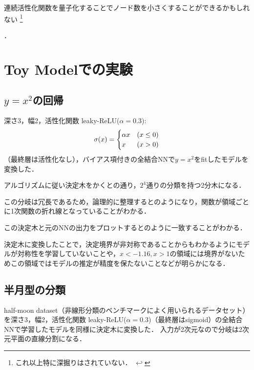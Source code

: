 \documentclass[dvipdfmx,autodetect-engine,12pt,fleqn]{jsarticle}
\newcounter{footnote-anchor}
\newcommand{\footnoteanchor}[1]{
    \hypertarget{footnote-anchor\arabic{footnote-anchor}}{}%
    \footnote{#1 \hyperlink{footnote-anchor\arabic{footnote-anchor}}{$\hookleftarrow$}}%
    \addtocounter{footnote-anchor}{1}
}
\begin{document}
連続活性化関数を量子化することでノード数を小さくすることができるかもしれない\footnoteanchor{これ以上特に深掘りはされていない．}．

\section{Toy Modelでの実験}

\subsection{$y=x^2$の回帰}

深さ3，幅2，活性化関数 leaky-ReLU($\alpha=0.3$):
\[
\sigma\lparen x\rparen=\begin{cases}
\alpha x & (x\le 0)\\
x & (x>0)
\end{cases}
\]
（最終層は活性化なし），バイアス項付きの全結合NNで$y=x^2$をfitしたモデルを変換した．

アルゴリズムに従い決定木をかくとの通り，$2^4$通りの分類を持つ2分木になる．


この分岐は冗長であるため，論理的に整理するとのようになり，関数が領域ごとに1次関数の折れ線となっていることがわかる．


この決定木と元のNNの出力をプロットするとのように一致することがわかる．


決定木に変換したことで，決定境界が非対称であることからもわかるようにモデルが対称性を学習していないことや，$x<-1.16, x>1$の領域には境界がないためこの領域ではモデルの推定が精度を保たないことなどが明らかになる．

\subsection{半月型の分類}

half-moon dataset（非線形分類のベンチマークによく用いられるデータセット）を深さ3，幅2，活性化関数 leaky-ReLU($\alpha=0.3$)（最終層はsigmoid）の全結合NNで学習したモデルを同様に決定木に変換した．
入力が2次元なので分岐は2次元平面の直線分割になる．
\end{document}
